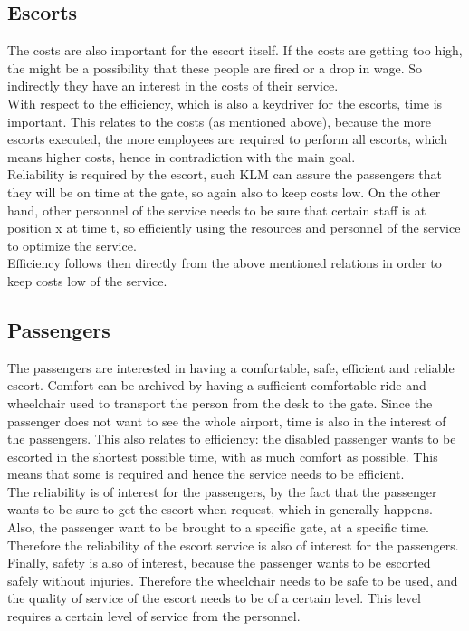 \documentclass[a4paper, 11pt, notitlepage]{report}
\begin{document}
\subsection{Escorts}
The costs are also important for the escort itself. If the costs are getting too high, the might be a possibility that these people are fired or a drop in wage. So indirectly they have an interest in the costs of their service.\\
With respect to the efficiency, which is also a keydriver for the escorts, time is important. This relates to the costs (as mentioned above), because the more escorts executed, the more employees are required to perform all escorts, which means higher costs, hence in contradiction with the main goal. \\
Reliability is required by the escort, such KLM can assure the passengers that they will be on time at the gate, so again also to keep costs low. On the other hand, other personnel of the service needs to be sure that certain staff is at position x at time t, so efficiently using the resources and personnel of the service to optimize the service.\\
Efficiency follows then directly from the above mentioned relations in order to keep costs low of the service.
\subsection{Passengers}
The passengers are interested in having a comfortable, safe, efficient and reliable escort. Comfort can be archived by having a sufficient comfortable ride and wheelchair used to transport the person from the desk to the gate. Since the passenger does not want to see the whole airport,  time is also in the interest of the passengers. This also relates to efficiency: the disabled passenger wants to be escorted in the shortest possible time, with as much comfort as possible. This means that some  is required and hence the service needs to be efficient. \\
The reliability is of interest for the passengers, by the fact that
the passenger wants to be sure to get the escort when request, which in generally happens. Also, the passenger want to be brought to a specific gate, at a specific time. Therefore the reliability of the escort service is also of interest for the passengers.\\
Finally, safety is also of interest, because the passenger wants to be escorted safely without injuries. Therefore the wheelchair needs to be safe to be used, and the quality of service of the escort needs to be of a certain level. This level requires a certain level of service from the personnel.
\end{document}
